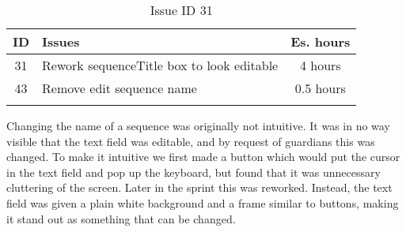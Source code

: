 \begin{longtable} { | c | p{12cm} | c | } 
\hline
	ID 	&	Issues	&		 Es. hours \\\hline
	31 	&	Rework sequenceTitle box to look editable	&	4 hours \\\hline
	43	&	Remove edit sequence name 					&	0.5 hours \\\hline
\caption{Issue ID 31}
\label{tab:spr2_reworktitlebox}
\end{longtable}

Changing the name of a sequence was originally not intuitive. It was in no way visible that the text field was editable, and by request of guardians this was changed. To make it intuitive we first made a button which would put the cursor in the text field and pop up the keyboard, but found that it was unnecessary cluttering of the screen. Later in the sprint this was reworked. Instead, the text field was given a plain white background and a frame similar to buttons, making it stand out as something that can be changed. 
